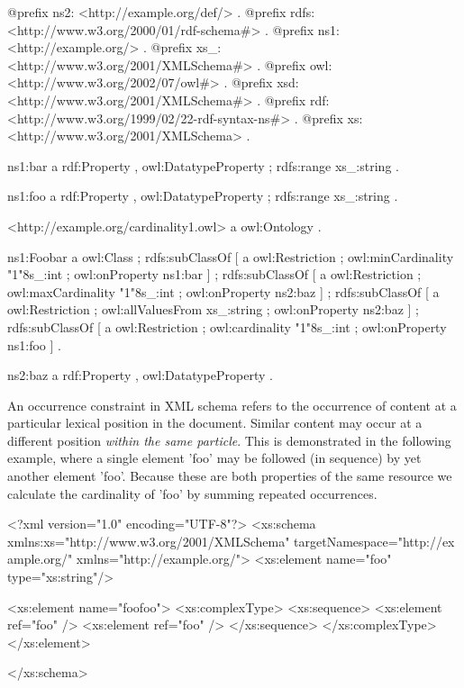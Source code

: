 \begin{DoxyCodeInclude}
@prefix ns2:     <http://example.org/def/> .
@prefix rdfs:    <http://www.w3.org/2000/01/rdf-schema#> .
@prefix ns1:     <http://example.org/> .
@prefix xs_:     <http://www.w3.org/2001/XMLSchema#> .
@prefix owl:     <http://www.w3.org/2002/07/owl#> .
@prefix xsd:     <http://www.w3.org/2001/XMLSchema#> .
@prefix rdf:     <http://www.w3.org/1999/02/22-rdf-syntax-ns#> .
@prefix xs:      <http://www.w3.org/2001/XMLSchema> .

ns1:bar
      a       rdf:Property , owl:DatatypeProperty ;
      rdfs:range xs_:string .

ns1:foo
      a       rdf:Property , owl:DatatypeProperty ;
      rdfs:range xs_:string .

<http://example.org/cardinality1.owl>
      a       owl:Ontology .

ns1:Foobar
      a       owl:Class ;
      rdfs:subClassOf
              [ a       owl:Restriction ;
                owl:minCardinality "1"^^xs_:int ;
                owl:onProperty ns1:bar
              ] ;
      rdfs:subClassOf
              [ a       owl:Restriction ;
                owl:maxCardinality "1"^^xs_:int ;
                owl:onProperty ns2:baz
              ] ;
      rdfs:subClassOf
              [ a       owl:Restriction ;
                owl:allValuesFrom xs_:string ;
                owl:onProperty ns2:baz
              ] ;
      rdfs:subClassOf
              [ a       owl:Restriction ;
                owl:cardinality "1"^^xs_:int ;
                owl:onProperty ns1:foo
              ] .

ns2:baz
      a       rdf:Property , owl:DatatypeProperty .
\end{DoxyCodeInclude}


An occurrence constraint in XML schema refers to the occurrence of content at a particular lexical position in the document. Similar content may occur at a different position {\itshape within the same particle\/}. This is demonstrated in the following example, where a single element 'foo' may be followed (in sequence) by yet another element 'foo'. Because these are both properties of the same resource we calculate the cardinality of 'foo' by summing repeated occurrences.


\begin{DoxyCodeInclude}
<?xml version="1.0" encoding="UTF-8"?>
<xs:schema xmlns:xs="http://www.w3.org/2001/XMLSchema" targetNamespace="http://ex
      ample.org/" xmlns="http://example.org/">        
        <xs:element name="foo" type="xs:string"/>
        
        <xs:element name="foofoo">
                <xs:complexType>
                        <xs:sequence>
                                <xs:element ref="foo" />
                                <xs:element ref="foo" />
                        </xs:sequence>
                </xs:complexType>
        </xs:element>

</xs:schema>
\end{DoxyCodeInclude}


